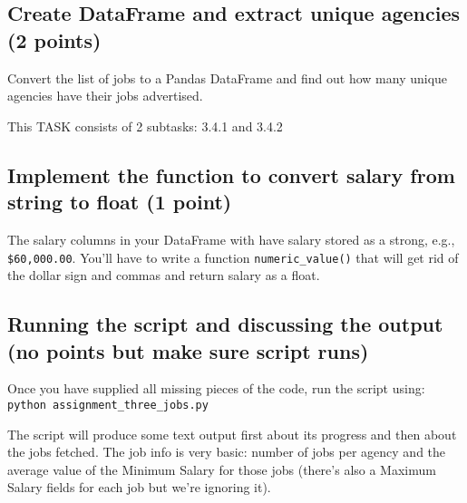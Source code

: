 \documentclass{article}
\begin{document}
\subsection{Create DataFrame and extract unique agencies (2 points)}

Convert the list of jobs to a Pandas DataFrame and find out how many unique agencies have their jobs advertised.

This TASK consists of 2 subtasks: 3.4.1 and 3.4.2

\subsection{Implement the function to convert salary from string to float (1 point)}

The salary columns in your DataFrame with have salary stored as a strong, e.g., \verb#$60,000.00#. You'll have
to write a function \verb#numeric_value()# that will get rid of the dollar sign and commas and return salary as a float.

\subsection{Running the script and discussing the output (no points but make sure script runs)}

Once you have supplied all missing pieces of the code, run the script using:\\
{\tt python assignment\_three\_jobs.py}

The script will produce some text output first about its progress and then about the jobs fetched.
The job info is very basic: number of jobs per agency and the average value of the Minimum Salary
for those jobs (there's also a Maximum Salary fields for each job but we're ignoring it).
\end{document}
